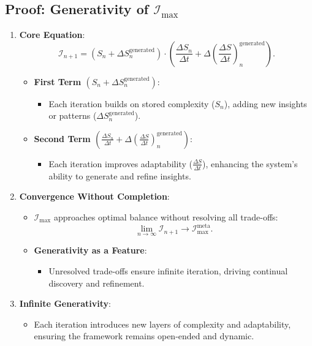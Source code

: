 \documentclass[12pt]{article}
\begin{document}
\subsection{Proof: Generativity of \(\mathcal{I}_{\text{max}}\)}
\begin{enumerate}
    \item \textbf{Core Equation}:
    \[
    \mathcal{I}_{n+1} = \left( S_n + \Delta S_n^{\text{generated}} \right) \cdot \left( \frac{\Delta S_n}{\Delta t} + \Delta \left( \frac{\Delta S}{\Delta t} \right)_n^{\text{generated}} \right).
    \]
    \begin{itemize}
        \item \textbf{First Term \((S_n + \Delta S_n^{\text{generated}})\)}:
        \begin{itemize}
            \item Each iteration builds on stored complexity (\(S_n\)), adding new insights or patterns (\(\Delta S_n^{\text{generated}}\)).
        \end{itemize}
        \item \textbf{Second Term \(\left( \frac{\Delta S_n}{\Delta t} + \Delta \left( \frac{\Delta S}{\Delta t} \right)_n^{\text{generated}} \right)\)}:
        \begin{itemize}
            \item Each iteration improves adaptability (\(\frac{\Delta S}{\Delta t}\)), enhancing the system’s ability to generate and refine insights.
        \end{itemize}
    \end{itemize}

    \item \textbf{Convergence Without Completion}:
    \begin{itemize}
        \item \(\mathcal{I}_{\text{max}}\) approaches optimal balance without resolving all trade-offs:
        \[
        \lim_{n \to \infty} \mathcal{I}_{n+1} \to \mathcal{I}_{\text{max}}^{\text{meta}}.
        \]
        \item \textbf{Generativity as a Feature}:
        \begin{itemize}
            \item Unresolved trade-offs ensure infinite iteration, driving continual discovery and refinement.
        \end{itemize}
    \end{itemize}

    \item \textbf{Infinite Generativity}:
    \begin{itemize}
        \item Each iteration introduces new layers of complexity and adaptability, ensuring the framework remains open-ended and dynamic.
    \end{itemize}
\end{enumerate}
\end{document}
